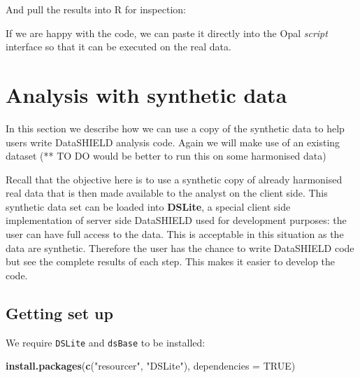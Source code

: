 \documentclass[
]{book}
\newenvironment{Shaded}{\begin{snugshade}}{\end{snugshade}}
\newcommand{\DataTypeTok}[1]{\textcolor[rgb]{0.13,0.29,0.53}{#1}}
\newcommand{\KeywordTok}[1]{\textcolor[rgb]{0.13,0.29,0.53}{\textbf{#1}}}
\newcommand{\NormalTok}[1]{#1}
\newcommand{\OperatorTok}[1]{\textcolor[rgb]{0.81,0.36,0.00}{\textbf{#1}}}
\newcommand{\OtherTok}[1]{\textcolor[rgb]{0.56,0.35,0.01}{#1}}
\newcommand{\StringTok}[1]{\textcolor[rgb]{0.31,0.60,0.02}{#1}}
\begin{document}
And pull the results into R for inspection:

\begin{Shaded}
\end{Shaded}

If we are happy with the code, we can paste it directly into the Opal \emph{script} interface so that it can be executed on the real data.

\hypertarget{analysis-with-synthetic-data}{%
\chapter{Analysis with synthetic data}\label{analysis-with-synthetic-data}}

In this section we describe how we can use a copy of the synthetic data to help users write DataSHIELD analysis code. Again we will make use of an existing dataset (** TO DO would be better to run this on some harmonised data)

Recall that the objective here is to use a synthetic copy of already harmonised real data that is then made available to the analyst on the client side. This synthetic data set can be loaded into \textbf{DSLite}, a special client side implementation of server side DataSHIELD used for development purposes: the user can have full access to the data. This is acceptable in this situation as the data are synthetic. Therefore the user has the chance to write DataSHIELD code but see the complete results of each step. This makes it easier to develop the code.

\hypertarget{getting-set-up-1}{%
\section{Getting set up}\label{getting-set-up-1}}

We require \texttt{DSLite} and \texttt{dsBase} to be installed:

\begin{Shaded}
\begin{Highlighting}[]
\KeywordTok{install.packages}\NormalTok{(}\KeywordTok{c}\NormalTok{(}\StringTok{"resourcer"}\NormalTok{, }\StringTok{"DSLite"}\NormalTok{), }\DataTypeTok{dependencies =} \OtherTok{TRUE}\NormalTok{)}
\end{Highlighting}
\end{Shaded}
\end{document}

